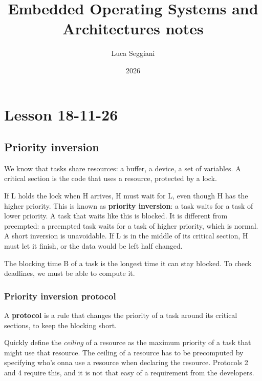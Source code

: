 \documentclass[a4paper,11pt]{article}
\title{Embedded Operating Systems and Architectures notes}
\author{Luca Seggiani}
\date{2026}
\begin{document}
\section{Lesson 18-11-26}

\thispagestyle{empty}
\pagestyle{fancy}

\subsection{Priority inversion}

We know that tasks share resources: a buffer, a device, a set of variables. A critical section is the code that uses a resource, protected by a lock.

If L holds the lock when H arrives, H must wait for L, even though H has the higher priority.
This is known as \textbf{priority inversion}: a task waits for a task of lower priority.
A task that waits like this is blocked. It is different from preempted: a preempted task waits for a task of higher priority, which is normal.
A short inversion is unavoidable. If L is in the middle of its critical section, H must let it finish, or the data would be left half changed.

The blocking time B of a task is the longest time it can stay blocked. To check deadlines, we must be able to compute it.

\subsubsection{Priority inversion protocol}

A \textbf{protocol} is a rule that changes the priority of a task around its critical sections, to keep the blocking short.

Quickly define the \textit{ceiling} of a resource as the maximum priority of a task that might use that resource. The ceiling of a resource has to be precomputed by specifying who's onna use a resource when declaring the resource.
Protocols 2 and 4 require this, and it is not that easy of a requirement from the developers.
\end{document}
